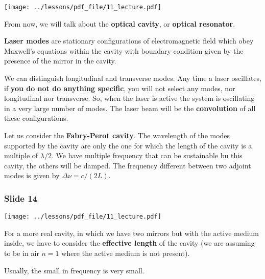 \documentclass[../main/main.tex]{subfiles}
\begin{document}
\begin{minipage}[]{0.5\linewidth}
\centering
\texttt{[image: ../lessons/pdf\_file/11\_lecture.pdf]}
\end{minipage}
\hspace{0.3cm}\vspace{0.3cm}
\begin{minipage}[c]{0.47\linewidth}

From now, we will talk about the \textbf{optical cavity}, or \textbf{optical resonator}.

\textbf{Laser modes} are stationary configurations of electromagnetic field which obey Maxwell's equations within the cavity with boundary condition given by the presence of the mirror in the cavity.

We can distinguish longitudinal and transverse modes. Any time a laser oscillates, if \textbf{you do not do anything specific}, you will not select any modes, nor longitudinal nor transverse. So, when the laser is active the system is oscillating in a very large number of modes. The laser beam will be the \textbf{convolution} of all these configurations.

\end{minipage}

Let us consider the \textbf{Fabry-Perot cavity}. The wavelength of the modes supported by the cavity are only the one for which the length of the cavity is a multiple of \( \lambda /2 \). We have multiple frequency that can be sustainable bu this cavity, the others will be damped. The frequency different between two adjoint modes is given by \( \Delta \nu  = c / (2L) \).

\subsubsection*{Slide 14}

\begin{minipage}[]{0.5\linewidth}
\centering
\texttt{[image: ../lessons/pdf\_file/11\_lecture.pdf]}
\end{minipage}
\hspace{0.3cm}\vspace{0.3cm}
\begin{minipage}[c]{0.47\linewidth}

For a more real cavity, in which we have two mirrors but with the active medium inside, we have to consider the \textbf{effective length} of the cavity (we are assuming to be in air \( n=1 \) where the active medium is not present).

Usually, the small in frequency is very small.

\end{minipage}
\end{document}
